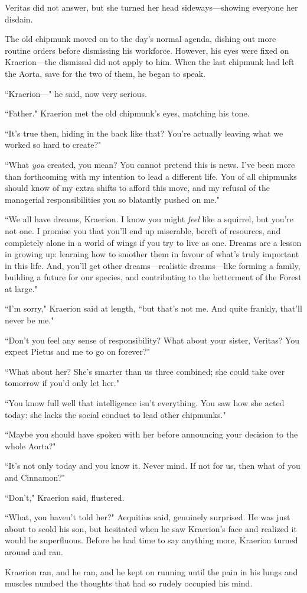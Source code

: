 Veritas did not answer, but she turned her head sideways---showing everyone her disdain.

The old chipmunk moved on to the day's normal agenda, dishing out more routine orders before dismissing his workforce.
However, his eyes were fixed on Kraerion---the dismissal did not apply to him.
When the last chipmunk had left the Aorta, save for the two of them, he began to speak.

``Kraerion---" he said, now very serious.

``Father." Kraerion met the old chipmunk's eyes, matching his tone.

``It's true then, hiding in the back like that?
You're actually leaving what we worked so hard to create?"

``What \textit{you} created, you mean?
You cannot pretend this is news. I've been more than forthcoming with my intention to lead a different life.
You of all chipmunks should know of my extra shifts to afford this move, and my refusal of the managerial responsibilities you so blatantly pushed on me."

``We all have dreams, Kraerion. I know you might \textit{feel} like a squirrel, but you're not one.
I promise you that you'll end up miserable, bereft of resources, and completely alone in a world of wings if you try to live as one.
Dreams are a lesson in growing up: learning how to smother them in favour of what's truly important in this life. And, you'll get other dreams---realistic dreams---like forming a family, building a future for our species, and contributing to the betterment of the Forest at large."

``I'm sorry," Kraerion said at length, ``but that's not me.
And quite frankly, that'll never be me."

``Don't you feel any sense of responsibility? What about your sister, Veritas?
You expect Pietus and me to go on forever?"

``What about her? She's smarter than us three combined; she could take over tomorrow if you'd only let her."

``You know full well that intelligence isn't everything.
You saw how she acted today: she lacks the social conduct to lead other chipmunks."

``Maybe you should have spoken with her before announcing your decision to the whole Aorta?"

``It's not only today and you know it.
Never mind.
If not for us, then what of you and Cinnamon?"

``Don't," Kraerion said, flustered.

``What, you haven't told her?" Aequitius said, genuinely surprised.
He was just about to scold his son, but hesitated when he saw Kraerion's face and realized it would be superfluous.
Before he had time to say anything more, Kraerion turned around and ran.

Kraerion ran, and he ran, and he kept on running until the pain in his lungs and muscles numbed the thoughts that had so rudely occupied his mind.

